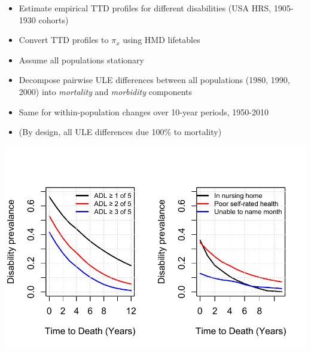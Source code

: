 \documentclass[20pt]{beamer}
\begin{document}
\begin{frame}[plain]
\Large
\begin{center}
\end{center}
\end{frame}
\begin{frame}[plain]
\Large
\begin{itemize}[<+->]
\item Estimate empirical TTD profiles for different disabilities (USA HRS, 1905-1930 cohorts)
\item Convert TTD profiles to $\pi_x$ using HMD lifetables
\item Assume all populations stationary
\item Decompose pairwise ULE differences between all populations (1980, 1990, 2000) into \emph{mortality} and \emph{morbidity} components
\item Same for within-population changes over 10-year periods, 1950-2010
\item (By design, all ULE differences due 100\% to mortality)
\end{itemize}
\end{frame}
\begin{frame}[plain]
\begin{center}
\includegraphics[scale=1.3]{Figures/DisbyTTD_pres.pdf}
\end{center}
\end{frame}
\end{document}
